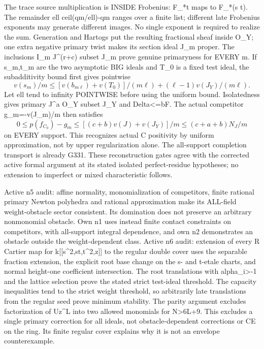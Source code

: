 \documentclass[11pt]{article}
\begin{document}
The trace source multiplication is INSIDE Frobenius: F\_*t maps to F\_*(s t). The remainder ell ceil(qm/ell)-qm ranges over a finite list; different late Frobenius exponents may generate different images. No single exponent is required to realize the sum. Generation and Hartogs put the resulting fractional sheaf inside O\_Y; one extra negative primary twist makes its section ideal J\_m proper. The inclusions I\_m J\textasciicircum{}(r+c) subset J\_m prove genuine primaryness for EVERY m. If s\_m,t\_m are the two asymptotic BIG ideals and T\_0 is a fixed test ideal, the subadditivity bound first gives pointwise
\[
 v(s_m)/m\le[v(b_{m\ell})+v(T_0)]/(m\ell)
                 +(\ell-1)v(J_Y)/(m\ell).
\]
Let ell tend to infinity POINTWISE before using the uniform bound. Isolatedness gives primary J\textasciicircum{}a O\_Y subset J\_Y and Delta<=bF. The actual competitor g\_m=-v(J\_m)/m then satisfies
\[
 0\le p(f_{C_0})-g_m\le[(c+b)v(J)+v(J_Y)]/m
                         \le(c+a+b)N_J/m
\]
on EVERY support. This recognizes actual C positivity by uniform approximation, not by upper regularization alone. The all-support completion transport is already G331. These reconstruction gates agree with the corrected active formal argument at its stated isolated perfect-residue hypotheses; no extension to imperfect or mixed characteristic follows.

Active n5 audit: affine normality, monomialization of competitors, finite rational primary Newton polyhedra and rational approximation make its ALL-field weight-obstacle sector consistent. Its domination does not preserve an arbitrary nonmonomial obstacle. Own n1 uses instead finite contact constraints on competitors, with all-support integral dependence, and own n2 demonstrates an obstacle outside the weight-dependent class. Active n6 audit: extension of every R Cartier map for k[[s\textasciicircum{}2,st,t\textasciicircum{}2,z]] to the regular double cover uses the separable fraction extension, the explicit root base change on the s- and t-etale charts, and normal height-one coefficient intersection. The root translations with alpha\_i>-1 and the lattice selection prove the stated strict test-ideal threshold. The capacity inequalities tend to the strict weight threshold, so arbitrarily late translations from the regular seed prove minimum stability. The parity argument excludes factorization of Uz\textasciicircum{}L into two allowed monomials for N>6L+9. This excludes a single primary correction for all ideals, not obstacle-dependent corrections or CE on the ring. Its finite regular cover explains why it is not an envelope counterexample.
\end{document}
